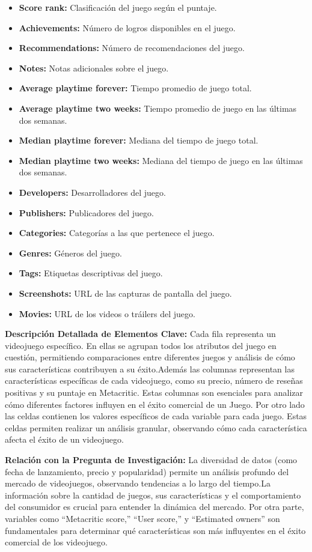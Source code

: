 \documentclass[
  letterpaper,
  DIV=11,
  numbers=noendperiod]{scrreprt}
\begin{document}
\begin{itemize}
\item
  \textbf{Score rank:} Clasificación del juego según el puntaje.
\item
  \textbf{Achievements:} Número de logros disponibles en el juego.
\item
  \textbf{Recommendations:} Número de recomendaciones del juego.
\item
  \textbf{Notes:} Notas adicionales sobre el juego.
\item
  \textbf{Average playtime forever:} Tiempo promedio de juego total.
\item
  \textbf{Average playtime two weeks:} Tiempo promedio de juego en las
  últimas dos semanas.
\item
  \textbf{Median playtime forever:} Mediana del tiempo de juego total.
\item
  \textbf{Median playtime two weeks:} Mediana del tiempo de juego en las
  últimas dos semanas.
\item
  \textbf{Developers:} Desarrolladores del juego.
\item
  \textbf{Publishers:} Publicadores del juego.
\item
  \textbf{Categories:} Categorías a las que pertenece el juego.
\item
  \textbf{Genres:} Géneros del juego.
\item
  \textbf{Tags:} Etiquetas descriptivas del juego.
\item
  \textbf{Screenshots:} URL de las capturas de pantalla del juego.
\item
  \textbf{Movies:} URL de los videos o tráilers del juego.
\end{itemize}

\textbf{Descripción Detallada de Elementos Clave:} Cada fila representa
un videojuego específico. En ellas se agrupan todos los atributos del
juego en cuestión, permitiendo comparaciones entre diferentes juegos y
análisis de cómo sus características contribuyen a su éxito.Además las
columnas representan las características específicas de cada videojuego,
como su precio, número de reseñas positivas y su puntaje en Metacritic.
Estas columnas son esenciales para analizar cómo diferentes factores
influyen en el éxito comercial de un Juego. Por otro lado las celdas
contienen los valores específicos de cada variable para cada juego.
Estas celdas permiten realizar un análisis granular, observando cómo
cada característica afecta el éxito de un videojuego.

\textbf{Relación con la Pregunta de Investigación:} La diversidad de
datos (como fecha de lanzamiento, precio y popularidad) permite un
análisis profundo del mercado de videojuegos, observando tendencias a lo
largo del tiempo.La información sobre la cantidad de juegos, sus
características y el comportamiento del consumidor es crucial para
entender la dinámica del mercado. Por otra parte, variables como
``Metacritic score,'' ``User score,'' y ``Estimated owners'' son
fundamentales para determinar qué características son más influyentes en
el éxito comercial de los videojuego.
\end{document}
